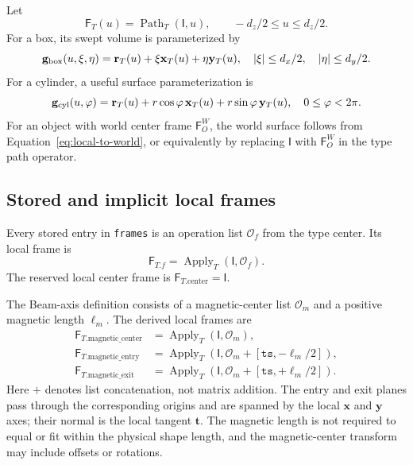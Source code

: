 \documentclass[11pt,a4paper]{article}
\newcommand{\Frame}{\mathsf{F}}
\newcommand{\Apply}{\operatorname{Apply}}
\newcommand{\Path}{\operatorname{Path}}
\newcommand{\ops}{\mathcal{O}}
\newcommand{\identity}{\mathsf{I}}
\begin{document}
Let
\begin{equation}
  \Frame_T(u)=\Path_T(\identity,u),
  \qquad -d_z/2\le u\le d_z/2.
\end{equation}
For a box, its swept volume is parameterized by
\begin{equation}
  \mathbf{g}_{\rm box}(u,\xi,\eta)
  =\mathbf{r}_T(u)+\xi\mathbf{x}_T(u)+\eta\mathbf{y}_T(u),
  \quad
  |\xi|\le d_x/2,\quad |\eta|\le d_y/2.
  \label{eq:box-sweep}
\end{equation}
For a cylinder, a useful surface parameterization is
\begin{equation}
  \mathbf{g}_{\rm cyl}(u,\varphi)
  =\mathbf{r}_T(u)
   +r\cos\varphi\,\mathbf{x}_T(u)
   +r\sin\varphi\,\mathbf{y}_T(u),
  \quad 0\le\varphi<2\pi.
  \label{eq:cylinder-sweep}
\end{equation}
For an object with world center frame $\Frame_O^W$, the world surface follows
from Equation~\eqref{eq:local-to-world}, or equivalently by replacing
$\identity$ with $\Frame_O^W$ in the type path operator.

\subsection{Stored and implicit local frames}

Every stored entry in \texttt{frames} is an operation list $\ops_f$ from the
type center.  Its local frame is
\begin{equation}
  \Frame_{T.f}=\Apply_T(\identity,\ops_f).
  \label{eq:named-local-frame}
\end{equation}
The reserved local center frame is
$\Frame_{T.\mathrm{center}}=\identity$.

The Beam-axis definition consists of a magnetic-center list $\ops_m$ and a
positive magnetic length $\ell_m$.  The derived local frames are
\begin{align}
  \Frame_{T.\mathrm{magnetic\_center}}
    &=\Apply_T(\identity,\ops_m),\\
  \Frame_{T.\mathrm{magnetic\_entry}}
    &=\Apply_T\!\left(\identity,
       \ops_m\mathbin{+}[\texttt{ts},-\ell_m/2]\right),\\
  \Frame_{T.\mathrm{magnetic\_exit}}
    &=\Apply_T\!\left(\identity,
       \ops_m\mathbin{+}[\texttt{ts},+\ell_m/2]\right).
  \label{eq:magnetic-frames}
\end{align}
Here $+$ denotes list concatenation, not matrix addition.  The entry and exit
planes pass through the corresponding origins and are spanned by the local
$\mathbf{x}$ and $\mathbf{y}$ axes; their normal is the local tangent
$\mathbf{t}$.  The magnetic length is not required to equal or fit within the
physical shape length, and the magnetic-center transform may include offsets
or rotations.
\end{document}
